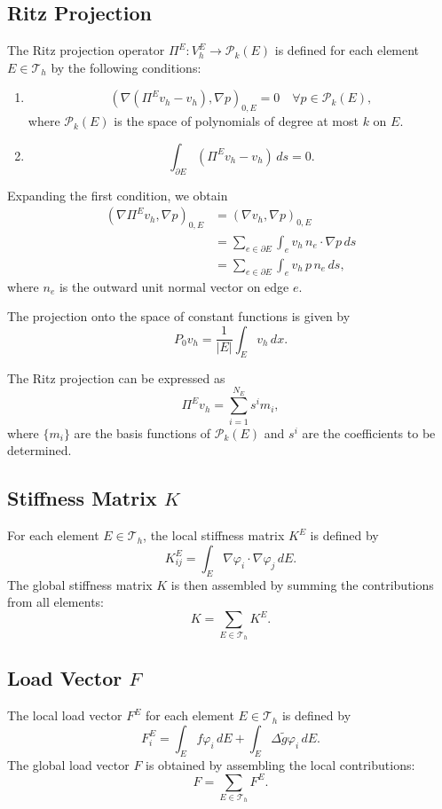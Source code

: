 \documentclass{report}
\begin{document}
\subsection{Ritz Projection}
The Ritz projection operator $\Pi^E: V_h^E \rightarrow \mathcal{P}_k(E)$ is defined for each element $E \in \mathcal{T}_h$ by the following conditions:
\begin{enumerate}
    \item
    \[
    (\nabla (\Pi^E v_h - v_h), \nabla p)_{0,E} = 0 \quad \forall p \in \mathcal{P}_k(E),
    \]
    where $\mathcal{P}_k(E)$ is the space of polynomials of degree at most $k$ on $E$.
    
    \item
    \[
    \int_{\partial E} (\Pi^E v_h - v_h) \, ds = 0.
    \]
\end{enumerate}

Expanding the first condition, we obtain
\begin{align*}
(\nabla \Pi^E v_h, \nabla p)_{0,E} &= (\nabla v_h, \nabla p)_{0,E} \\
&= \sum_{e \in \partial E} \int_e v_h \, n_e \cdot \nabla p \, ds \\
&= \sum_{e \in \partial E} \int_e v_h \, p \, n_e \, ds,
\end{align*}
where $n_e$ is the outward unit normal vector on edge $e$.

The projection onto the space of constant functions is given by
\[
P_0 v_h = \frac{1}{|E|} \int_E v_h \, dx.
\]

The Ritz projection can be expressed as
\[
\Pi^E v_h = \sum_{i=1}^{N_E} s^i m_i,
\]
where $\{m_i\}$ are the basis functions of $\mathcal{P}_k(E)$ and $s^i$ are the coefficients to be determined.


\subsection{Stiffness Matrix $K$}
For each element $E \in \mathcal{T}_h$, the local stiffness matrix $K^E$ is defined by
\[
K^E_{ij} = \int_E \nabla \varphi_i \cdot \nabla \varphi_j \, dE.
\]
The global stiffness matrix $K$ is then assembled by summing the contributions from all elements:
\begin{equation}
    K = \sum_{E \in \mathcal{T}_h} K^E.
\end{equation}

\subsection{Load Vector $F$}
The local load vector $F^E$ for each element $E \in \mathcal{T}_h$ is defined by
\[
F^E_i = \int_E f \varphi_i \, dE + \int_E \Delta\tilde{g} \varphi_i \, dE.
\]
The global load vector $F$ is obtained by assembling the local contributions:
\begin{equation}
    F = \sum_{E \in \mathcal{T}_h} F^E.
\end{equation}
\end{document}
